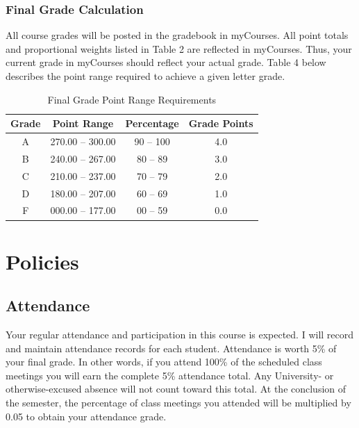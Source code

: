 \documentclass[
]{article}
\begin{document}
\subsubsection{Final Grade Calculation}

All course grades will be posted in the gradebook in myCourses. All
point totals and proportional weights listed in Table 2 are reflected in
myCourses. Thus, your current grade in myCourses should reflect your
actual grade. Table 4 below describes the point range required to
achieve a given letter grade.

\begin{table}[H]
\begin{center}
\caption{Final Grade Point Range Requirements}
\label{finalgrades}
\vspace{3mm}
\begin{tabular}{cccc}
\hline
\bf{Grade} & \bf{Point Range} & \bf{Percentage} & \bf{Grade Points}\\
\hline
A & 270.00 -- 300.00 & 90 -- 100 & 4.0\\ 
B & 240.00 -- 267.00 & 80 -- 89  & 3.0\\ 
C & 210.00 -- 237.00 & 70 -- 79  & 2.0\\ 
D & 180.00 -- 207.00 & 60 -- 69  & 1.0\\ 
F & 000.00 -- 177.00 & 00 -- 59  & 0.0\\
\hline
\end{tabular}
\end{center}
\end{table}

\section{Policies}

\subsection{Attendance}

Your regular attendance and participation in this course is expected. I
will record and maintain attendance records for each student. Attendance
is worth 5\% of your final grade. In other words, if you attend 100\% of
the scheduled class meetings you will earn the complete 5\% attendance
total. Any University- or otherwise-excused absence will not count
toward this total. At the conclusion of the semester, the percentage of
class meetings you attended will be multiplied by 0.05 to obtain your
attendance grade.
\end{document}
